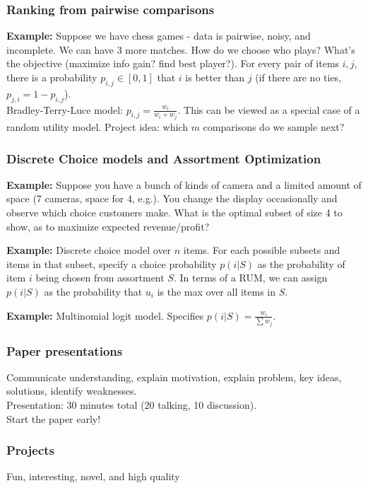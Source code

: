 \documentclass[twoside]{article}
\begin{document}
\subsubsection*{Ranking from pairwise comparisons}

\textbf{Example:} Suppose we have chess games - data is pairwise, noisy, and incomplete.  We can have 3 more matches.  How do we choose who plays?  What's the objective (maximize info gain? find best player?).  For every pair of items $i,j$, there is a probability $p_{i,j}\in [0,1]$ that $i$ is better than $j$ (if there are no ties, $p_{j,i} = 1-p_{i,j}$).\\

Bradley-Terry-Luce model: $p_{i,j} = \frac{w_i}{w_i+w_j}$.  This can be viewed as a special case of a random utility model.  Project idea: which $m$ comparisons do we sample next?

\subsubsection*{Discrete Choice models and Assortment Optimization}

\textbf{Example:} Suppose you have a bunch of kinds of camera and a limited amount of space (7 cameras, space for 4, e.g.).  You change the display occasionally and observe which choice customers make.  What is the optimal subset of size 4 to show, as to maximize expected revenue/profit?

\textbf{Example:} Discrete choice model over $n$ items.  For each possible subsets and items in that subset, specify a choice probability $p(i|S)$ as the probability of item $i$ being chosen from assortment $S$.  In terms of a RUM, we can assign $p(i|S)$ as the probability that $u_i$ is the max over all items in $S$.

\textbf{Example:} Multinomial logit model.  Specifies $p(i|S) = \frac{w_i}{\sum{w_j}}$.

\subsubsection*{Paper presentations}
Communicate understanding, explain motivation, explain problem, key ideas, solutions, identify weaknesses.\\

Presentation: 30 minutes total (20 talking, 10 discussion).\\

Start the paper early!


\subsubsection*{Projects}

Fun, interesting, novel, and high quality
\end{document}
